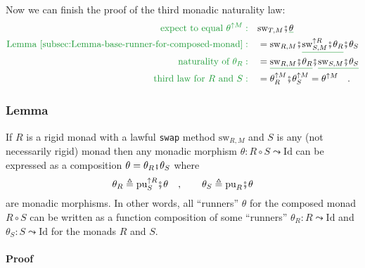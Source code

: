 Now we can finish the proof of the third monadic naturality law:
\begin{align*}
{\color{greenunder}\text{expect to equal }\theta^{\uparrow M}:}\quad & \text{sw}_{T,M}\bef\gunderline{\theta}\\
{\color{greenunder}\text{Lemma~\ref{subsec:Lemma-base-runner-for-composed-monad}}:}\quad & =\text{sw}_{R,M}\bef\gunderline{\text{sw}_{S,M}^{\uparrow R}\bef\theta_{R}}\bef\theta_{S}\\
{\color{greenunder}\text{naturality of }\theta_{R}:}\quad & =\gunderline{\text{sw}_{R,M}\bef\theta_{R}}\bef\gunderline{\text{sw}_{S,M}\bef\theta_{S}}\\
{\color{greenunder}\text{third law for }R\text{ and }S:}\quad & =\theta_{R}^{\uparrow M}\bef\theta_{S}^{\uparrow M}=\theta^{\uparrow M}\quad.
\end{align*}


\subsubsection{Lemma \label{subsec:Lemma-base-runner-for-composed-monad}}

If $R$ is a rigid monad with a lawful \lstinline!swap!
method $\text{sw}_{R,M}$ and $S$ is any (not necessarily rigid)
monad then any monadic morphism $\theta:R\circ S\leadsto\text{Id}$
can be expressed as a composition $\theta=\theta_{R}\bef\theta_{S}$
where 
\[
\theta_{R}\triangleq\text{pu}_{S}^{\uparrow R}\bef\theta\quad,\quad\quad\theta_{S}\triangleq\text{pu}_{R}\bef\theta
\]
are monadic morphisms. In other words, all ``runners'' $\theta$
for the composed monad $R\circ S$ can be written as a function composition
of some ``runners'' $\theta_{R}:R\leadsto\text{Id}$ and $\theta_{S}:S\leadsto\text{Id}$
for the monads $R$ and $S$. 

\paragraph{Proof}

